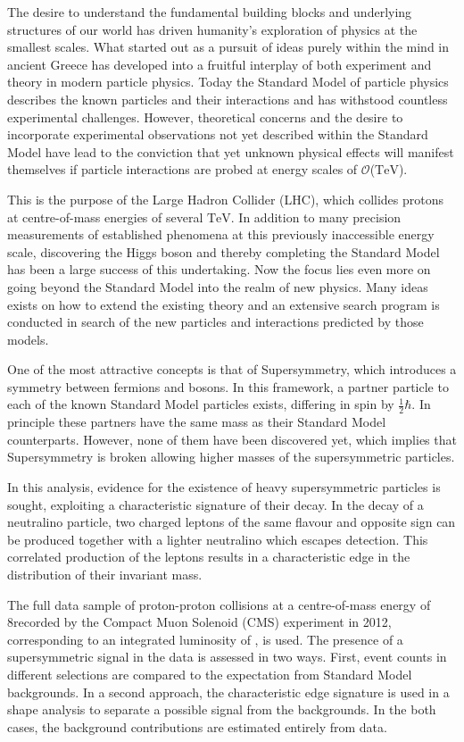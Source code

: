 The desire to understand the fundamental building blocks and underlying structures of our world has driven humanity's exploration of physics at the smallest scales. What started out as a pursuit of ideas purely within the mind in ancient Greece has developed into a fruitful interplay of both experiment and theory in modern particle physics. Today the Standard Model of particle physics describes the known particles and their interactions and has withstood countless experimental challenges. However, theoretical concerns and the desire to incorporate experimental observations not yet described within the Standard Model have lead to the conviction that yet unknown physical effects will manifest themselves if particle interactions are probed at energy scales of $\mathcal{O}$($\mathrm{TeV}$).

This is the purpose of the Large Hadron Collider (LHC), which collides protons at centre-of-mass energies of several $\mathrm{TeV}$. In addition to many precision measurements of established phenomena at this previously inaccessible energy scale, discovering the Higgs boson and thereby completing the Standard Model has been a large success of this undertaking. Now the focus lies even more on going beyond the Standard Model into the realm of new physics. Many ideas exists on how to extend the existing theory and an extensive search program is conducted in search of the new particles and interactions predicted by those models. 

One of the most attractive concepts is that of Supersymmetry, which introduces a symmetry between fermions and bosons. In this framework, a partner particle to each of the known Standard Model particles exists, differing in spin by $\frac{1}{2}\hbar$. In principle these partners have the same mass as their Standard Model counterparts. However, none of them have been discovered yet, which implies that Supersymmetry is broken allowing higher masses of the supersymmetric particles.

In this analysis, evidence for the existence of heavy supersymmetric particles is sought, exploiting a characteristic signature of their decay. In the decay of a neutralino particle, two charged leptons of the same flavour and opposite sign can be produced together with a lighter neutralino which escapes detection. This correlated production of the leptons results in a characteristic edge in the distribution of their invariant mass.

The full data sample of proton-proton collisions at a centre-of-mass energy of 8\TeV recorded by the Compact Muon Solenoid (CMS) experiment in 2012, corresponding to an integrated luminosity of \lumi, is used. The presence of a supersymmetric signal in the data is assessed in two ways. First, event counts in different selections are compared to the expectation from Standard Model backgrounds. In a second approach, the characteristic edge signature is used in a shape analysis to separate a possible signal from the backgrounds. In the both cases, the background contributions are estimated entirely from data. 

